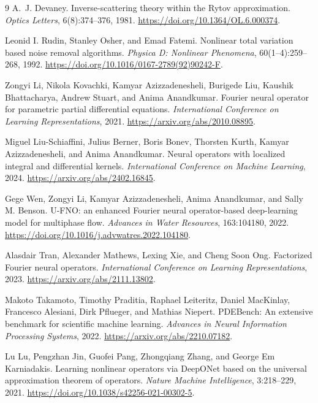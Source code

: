 \documentclass[11pt]{article}
\begin{document}
\begin{thebibliography}{9}
A.~J. Devaney.
\newblock Inverse-scattering theory within the Rytov approximation.
\newblock \emph{Optics Letters}, 6(8):374--376, 1981.
\newblock \url{https://doi.org/10.1364/OL.6.000374}.

Leonid I. Rudin, Stanley Osher, and Emad Fatemi.
\newblock Nonlinear total variation based noise removal algorithms.
\newblock \emph{Physica D: Nonlinear Phenomena}, 60(1--4):259--268, 1992.
\newblock \url{https://doi.org/10.1016/0167-2789(92)90242-F}.

Zongyi Li, Nikola Kovachki, Kamyar Azizzadenesheli, Burigede Liu,
Kaushik Bhattacharya, Andrew Stuart, and Anima Anandkumar.
\newblock Fourier neural operator for parametric partial differential equations.
\newblock \emph{International Conference on Learning Representations}, 2021.
\newblock \url{https://arxiv.org/abs/2010.08895}.

Miguel Liu-Schiaffini, Julius Berner, Boris Bonev, Thorsten Kurth,
Kamyar Azizzadenesheli, and Anima Anandkumar.
\newblock Neural operators with localized integral and differential kernels.
\newblock \emph{International Conference on Machine Learning}, 2024.
\newblock \url{https://arxiv.org/abs/2402.16845}.

Gege Wen, Zongyi Li, Kamyar Azizzadenesheli, Anima Anandkumar, and
Sally M. Benson.
\newblock U-FNO: an enhanced Fourier neural operator-based deep-learning
model for multiphase flow.
\newblock \emph{Advances in Water Resources}, 163:104180, 2022.
\newblock \url{https://doi.org/10.1016/j.advwatres.2022.104180}.

Alasdair Tran, Alexander Mathews, Lexing Xie, and Cheng Soon Ong.
\newblock Factorized Fourier neural operators.
\newblock \emph{International Conference on Learning Representations}, 2023.
\newblock \url{https://arxiv.org/abs/2111.13802}.

Makoto Takamoto, Timothy Praditia, Raphael Leiteritz, Daniel MacKinlay,
Francesco Alesiani, Dirk Pflueger, and Mathias Niepert.
\newblock PDEBench: An extensive benchmark for scientific machine learning.
\newblock \emph{Advances in Neural Information Processing Systems}, 2022.
\newblock \url{https://arxiv.org/abs/2210.07182}.

Lu Lu, Pengzhan Jin, Guofei Pang, Zhongqiang Zhang, and George Em Karniadakis.
\newblock Learning nonlinear operators via DeepONet based on the universal
approximation theorem of operators.
\newblock \emph{Nature Machine Intelligence}, 3:218--229, 2021.
\newblock \url{https://doi.org/10.1038/s42256-021-00302-5}.


\end{thebibliography}
\end{document}
